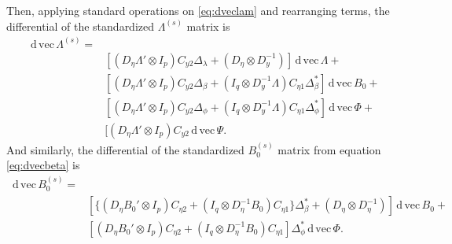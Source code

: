 \documentclass{article}
\newcommand{\n}{\eta}
\renewcommand{\l}{\lambda}
\renewcommand{\b}{\beta}
\newcommand{\p}{\phi}
\renewcommand{\d}{\,\mathrm{d}\,}
\newcommand{\kronprod}{\otimes}
\renewcommand{\vec}{\mathrm{vec}\,}
\begin{document}
Then, applying standard operations on \ref{eq:dveclam} and rearranging terms,
the differential of the standardized $\Lambda^{(s)}$ matrix is
\begin{equation}\label{eq:dveclam_final}
\begin{split}
  \d\vec\Lambda^{(s)} = &\\
     & [(D_\n \Lambda' \kronprod I_p) C_{y2} \Delta_\l + 
        (D_\n \kronprod D_y^{-1})] 
        \d\vec\Lambda +\\
     & [(D_\n \Lambda' \kronprod I_p) C_{y2} \Delta_\b + 
        (I_q \kronprod D_y^{-1}\Lambda) C_{\n1} \Delta^*_\b ] 
        \d\vec B_0 +\\
     & [(D_\n \Lambda' \kronprod I_p) C_{y2} \Delta_\p + 
        (I_q \kronprod D_y^{-1}\Lambda) C_{\n1} \Delta^*_\p ] 
        \d\vec \Phi +\\
     & [(D_\n \Lambda' \kronprod I_p) C_{y2} 
        \d\vec \Psi.
\end{split}\end{equation}
And similarly, the differential of the standardized $B_0^{(s)}$ matrix from
equation \ref{eq:dvecbeta} is
\begin{equation}\label{eq:dvecbeta_final}
\begin{split}
  \d\vec B_0^{(s)} = &\\
     & [\{(D_\n B_0' \kronprod I_p) C_{\n2}  + 
        (I_q \kronprod D_\n^{-1}B_0) C_{\n1} \} \Delta^*_\b +
           (D_\n \kronprod D_\n^{-1})  ] 
        \d\vec B_0 +\\
     & [(D_\n B_0' \kronprod I_p) C_{\n2}  + 
        (I_q \kronprod D_\n^{-1}B_0) C_{\n1} ] \Delta^*_\p 
        \d\vec \Phi.
\end{split}\end{equation}
\end{document}
